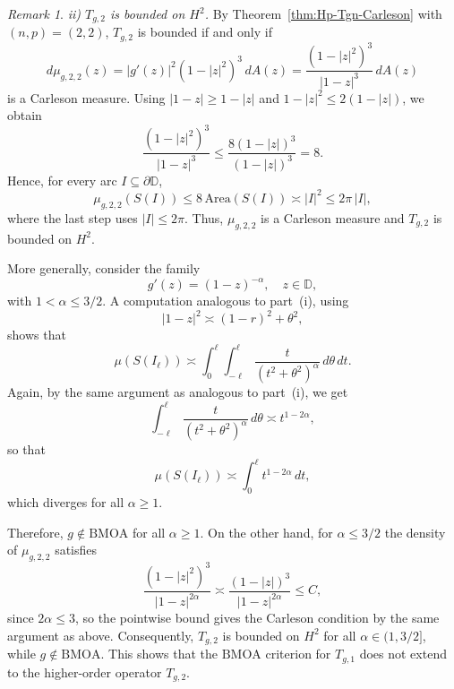 \documentclass[preprint,12pt]{elsarticle}
\numberwithin{equation}{section}
\theoremstyle{remark}
\newtheorem{remark}{Remark}[section]
\begin{document}
\begin{remark}
\smallskip
\noindent\textit{ii) $T_{g,2}$ is bounded on $H^2$.}
By Theorem~\ref{thm:Hp-Tgn-Carleson} with $(n,p)=(2,2)$, $T_{g,2}$
is bounded if and only if
\begin{equation*}
d\mu_{g,2,2}(z)=|g'(z)|^2(1-|z|^2)^3\,dA(z)
=\frac{(1-|z|^2)^3}{|1-z|^{3}}\,dA(z)
\end{equation*}
is a Carleson measure. Using $|1-z|\ge 1-|z|$ and
$1-|z|^2\le 2(1-|z|)$, we obtain
\begin{equation*}
\frac{(1-|z|^2)^3}{|1-z|^{3}}
\le \frac{8(1-|z|)^3}{(1-|z|)^3}
=8.
\end{equation*}
Hence, for every arc $I\subseteq\partial\mathbb{D}$,
\begin{equation*}
\mu_{g,2,2}(S(I))
\le 8\,\mathrm{Area}(S(I))
\asymp |I|^2
\le 2\pi\,|I|,
\end{equation*}
where the last step uses $|I|\le 2\pi$. Thus, $\mu_{g,2,2}$ is a
Carleson measure and $T_{g,2}$ is bounded on $H^2$.

More generally, consider the family
\begin{equation*}
g'(z) = (1-z)^{-\alpha}, \quad z\in\mathbb{D},
\end{equation*}
with $1<\alpha\le 3/2$.
A computation analogous to part~(i), using
\begin{equation*}
|1-z|^2 \asymp (1-r)^2+\theta^2,
\end{equation*}
shows that
\begin{equation*}
\mu(S(I_\ell))
\asymp \int_0^\ell \int_{-\ell}^{\ell}
\frac{t}{(t^2+\theta^2)^{\alpha}}\, d\theta\, dt.
\end{equation*}
Again, by the same argument as analogous to part~(i), we get
\begin{equation*}
\int_{-\ell}^{\ell} \frac{t}{(t^2+\theta^2)^{\alpha}}\, d\theta
\asymp t^{1-2\alpha},
\end{equation*}
so that
\begin{equation*}
\mu(S(I_\ell))
\asymp \int_0^\ell t^{1-2\alpha}\, dt,
\end{equation*}
which diverges for all $\alpha\ge 1$.

Therefore, $g\notin\mathrm{BMOA}$ for all $\alpha\geq 1$.
On the other hand, for $\alpha\le 3/2$ the density of $\mu_{g,2,2}$
satisfies
\begin{equation*}
\frac{(1-|z|^2)^3}{|1-z|^{2\alpha}}
\asymp
\frac{(1-|z|)^3}{|1-z|^{2\alpha}}
\leq C,
\end{equation*}
since $2\alpha\leq 3$, so the pointwise bound gives the Carleson
condition by the same argument as above.
Consequently, $T_{g,2}$ is bounded on $H^2$ for all
$\alpha\in(1,3/2]$, while $g\notin\mathrm{BMOA}$.
This shows that the $\mathrm{BMOA}$ criterion for $T_{g,1}$ does
not extend to the higher-order operator $T_{g,2}$.
\end{remark}
\end{document}
